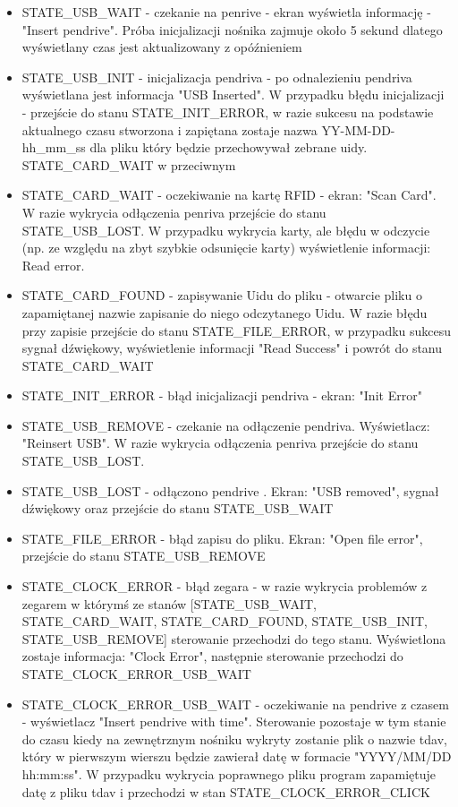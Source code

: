 \documentclass[declaration,shortabstract, mgr]{iithesis}
\begin{document}
\begin{itemize}
\item STATE\_USB\_WAIT - czekanie na penrive - ekran wyświetla informację -  "Insert pendrive". Próba inicjalizacji nośnika zajmuje około 5 sekund dlatego wyświetlany czas jest aktualizowany z opóźnieniem
\item STATE\_USB\_INIT - inicjalizacja pendriva - po odnalezieniu pendriva wyświetlana jest informacja "USB Inserted". W przypadku błędu inicjalizacji - przejście do stanu STATE\_INIT\_ERROR,  w razie sukcesu na podstawie aktualnego czasu stworzona i zapiętana zostaje nazwa YY-MM-DD-hh\_mm\_ss dla pliku który będzie przechowywał zebrane uidy. STATE\_CARD\_WAIT w przeciwnym
\item STATE\_CARD\_WAIT - oczekiwanie na kartę RFID - ekran: "Scan Card". W razie wykrycia odłączenia penriva przejście do stanu STATE\_USB\_LOST. W przypadku wykrycia karty, ale błędu w odczycie (np. ze względu na zbyt szybkie odsunięcie karty) wyświetlenie informacji: Read error.
\item STATE\_CARD\_FOUND - zapisywanie Uidu do pliku - otwarcie pliku o zapamiętanej nazwie zapisanie do niego odczytanego Uidu. W razie błędu przy zapisie przejście do stanu STATE\_FILE\_ERROR, w przypadku sukcesu sygnał dźwiękowy, wyświetlenie informacji "Read Success" i powrót do stanu STATE\_CARD\_WAIT
\item STATE\_INIT\_ERROR - błąd inicjalizacji pendriva - ekran: "Init Error"
\item STATE\_USB\_REMOVE - czekanie na odłączenie pendriva. Wyświetlacz: "Reinsert USB". W razie wykrycia odłączenia penriva przejście do stanu STATE\_USB\_LOST.
\item STATE\_USB\_LOST - odłączono pendrive . Ekran: "USB removed", sygnał dźwiękowy oraz przejście do stanu STATE\_USB\_WAIT
\item STATE\_FILE\_ERROR - błąd zapisu do pliku. Ekran: "Open file error", przejście do stanu STATE\_USB\_REMOVE
\item STATE\_CLOCK\_ERROR  - błąd zegara - w razie wykrycia problemów z zegarem w którymś ze stanów [STATE\_USB\_WAIT, STATE\_CARD\_WAIT, STATE\_CARD\_FOUND, STATE\_USB\_INIT, STATE\_USB\_REMOVE] sterowanie przechodzi do tego stanu. Wyświetlona zostaje informacja: "Clock Error", następnie sterowanie przechodzi do STATE\_CLOCK\_ERROR\_USB\_WAIT
\item STATE\_CLOCK\_ERROR\_USB\_WAIT - oczekiwanie na pendrive z czasem - wyświetlacz "Insert pendrive with time". Sterowanie pozostaje w tym stanie do czasu kiedy na zewnętrznym nośniku wykryty zostanie plik o nazwie tdav, który w pierwszym wierszu będzie zawierał datę w formacie "YYYY/MM/DD hh:mm:ss". W przypadku wykrycia poprawnego pliku program zapamiętuje datę z pliku tdav i przechodzi w stan STATE\_CLOCK\_ERROR\_CLICK\\

\end{itemize}
\end{document}
